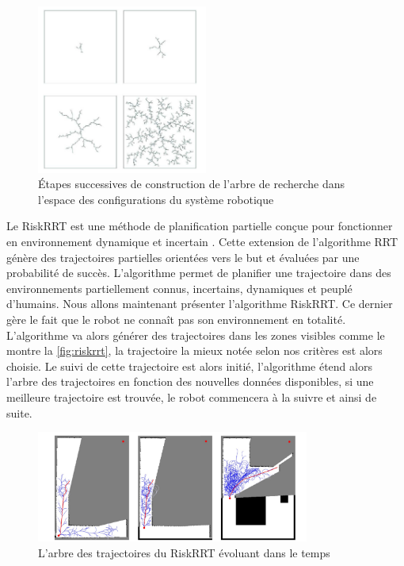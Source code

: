 \begin{figure}
    \centering
    \includegraphics[width=0.5\textwidth]{Rapport/images/rrt.png}
    \caption{Étapes successives de construction de l'arbre de recherche dans l'espace des configurations du système robotique}
    \label{fig:rrt}
\end{figure}

Le RiskRRT est une méthode de planification partielle conçue pour fonctionner en environnement dynamique et incertain \cite{spalanzani_contribution_2015}. Cette extension de l'algorithme RRT génère des trajectoires partielles orientées vers le but et évaluées par une probabilité de succès. L'algorithme permet de planifier une trajectoire dans des environnements partiellement connus, incertains, dynamiques et peuplé d'humains. Nous allons maintenant présenter l'algorithme RiskRRT. Ce dernier gère le fait que le robot ne connaît pas son environnement en totalité. L'algorithme va alors générer des trajectoires dans les zones visibles comme le montre la \autoref{fig:riskrrt}, la trajectoire la mieux notée selon nos critères est alors choisie. Le suivi de cette trajectoire est alors initié, l'algorithme étend alors l'arbre des trajectoires en fonction des nouvelles données disponibles, si une meilleure trajectoire est trouvée, le robot commencera à la suivre et ainsi de suite.

\begin{figure}
    \centering
    \includegraphics[width=0.8\textwidth]{Rapport/images/riskrrt.png}
    \caption{L'arbre des trajectoires du RiskRRT évoluant dans le temps}
    \label{fig:riskrrt}
\end{figure}

